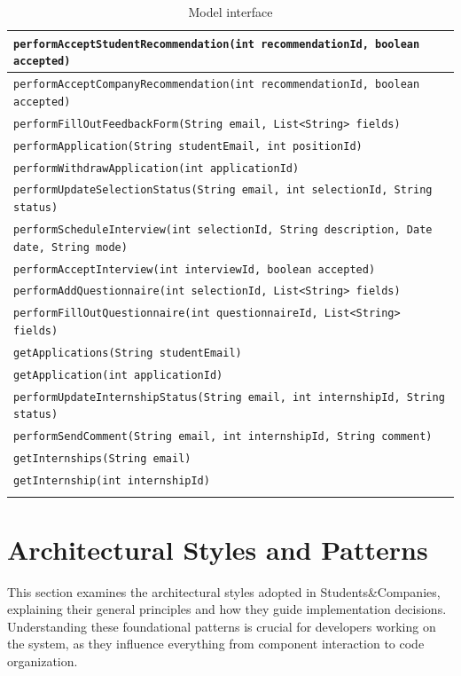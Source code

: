 \begin{longtable}{|p{14.5cm}|}
    \texttt{performAcceptStudentRecommendation(int recommendationId, boolean accepted)} \\ \hline
    \texttt{performAcceptCompanyRecommendation(int recommendationId, boolean accepted)} \\ \hline
    \texttt{performFillOutFeedbackForm(String email, List<String> fields)} \\ \hline
    
    \texttt{performApplication(String studentEmail, int positionId)} \\ \hline
    \texttt{performWithdrawApplication(int applicationId)} \\ \hline
    \texttt{performUpdateSelectionStatus(String email, int selectionId, String status)} \\ \hline
    \texttt{performScheduleInterview(int selectionId, String description, Date date, String mode)} \\ \hline
    \texttt{performAcceptInterview(int interviewId, boolean accepted)} \\ \hline
    \texttt{performAddQuestionnaire(int selectionId, List<String> fields)} \\ \hline
    \texttt{performFillOutQuestionnaire(int questionnaireId, List<String> fields)} \\ \hline
    \texttt{getApplications(String studentEmail)} \\ \hline
    \texttt{getApplication(int applicationId)} \\ \hline
    
    \texttt{performUpdateInternshipStatus(String email, int internshipId, String status)} \\ \hline
    \texttt{performSendComment(String email, int internshipId, String comment)} \\ \hline
    \texttt{getInternships(String email)} \\ \hline
    \texttt{getInternship(int internshipId)} \\ \hline
\caption{Model interface}
\end{longtable}

\section{Architectural Styles and Patterns}
This section examines the architectural styles adopted in Students\&Companies, explaining their general principles and how they guide implementation decisions.
Understanding these foundational patterns is crucial for developers working on the system, as they influence everything from component interaction to code organization.

